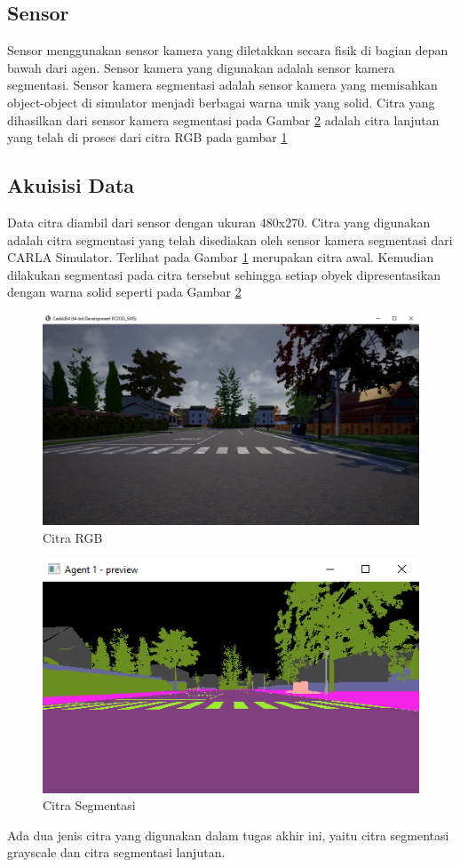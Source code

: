 \documentclass[conference]{IEEEtran}
\begin{document}
\subsection{Sensor}
\label{sec:sensor}
Sensor menggunakan sensor kamera yang diletakkan secara fisik di bagian depan bawah dari agen. Sensor kamera yang digunakan adalah sensor kamera segmentasi. Sensor kamera segmentasi adalah sensor kamera yang memisahkan object-object di simulator menjadi berbagai warna unik yang solid. Citra yang dihasilkan dari sensor kamera segmentasi pada Gambar \ref{fig:segmentasi} adalah citra lanjutan yang telah di proses dari citra RGB pada gambar \ref{fig:citra_rgb}


\subsection{Akuisisi Data}
\label{sec:akuisisi_data}
Data citra diambil dari sensor dengan ukuran 480x270. Citra yang digunakan adalah citra segmentasi yang telah disediakan oleh sensor kamera segmentasi dari CARLA Simulator. Terlihat pada Gambar \ref{fig:citra_rgb} merupakan citra awal. Kemudian dilakukan segmentasi pada citra tersebut sehingga setiap obyek dipresentasikan dengan warna solid seperti pada Gambar \ref{fig:segmentasi}

\begin{figure}[H] 
	\centering
	\includegraphics[width=.7\linewidth]{images/rgb}
	\caption{Citra RGB}
	\label{fig:citra_rgb}
\end{figure}
\begin{figure}[H] 
	\centering
	\includegraphics[width=.7\linewidth]{images/segmentasi}
	\caption{Citra Segmentasi}
	\label{fig:segmentasi}
\end{figure}
Ada dua jenis citra yang digunakan dalam tugas akhir ini, yaitu citra segmentasi grayscale dan citra segmentasi lanjutan.
\end{document}
